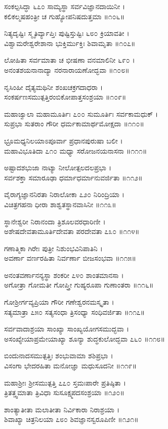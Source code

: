 ಸಂಕಲ್ಪಸಿದ್ಧಾ ೬೭೦ ಸಾಮ್ಯಸ್ಥಾ ಸರ್ವವಿಜ್ಞಾನದಾಯಿನೀ ।\\
ಕಲಿಕಲ್ಮಷಹಂತ್ರೀ ಚ ಗುಹ್ಯೋಪನಿಷದುತ್ತಮಾ ॥೧೦೬॥

ನಿತ್ಯದೃಷ್ಟಿಃ ಸ್ಮೃತಿರ್ವ್ಯಾಪ್ತಿಃ ಪುಷ್ಟಿಸ್ತುಷ್ಟಿಃ ೬೮೦ ಕ್ರಿಯಾವತೀ ।\\
ವಿಶ್ವಾಮರೇಶ್ವರೇಶಾನಾ ಭುಕ್ತಿರ್ಮುಕ್ತಿಃ ಶಿವಾಮೃತಾ ॥೧೦೭॥

ಲೋಹಿತಾ ಸರ್ವಮಾತಾ ಚ ಭೀಷಣಾ ವನಮಾಲಿನೀ ೬೯೦ ।\\
ಅನಂತಶಯನಾನಾದ್ಯಾ ನರನಾರಾಯಣೋದ್ಭವಾ ॥೧೦೮॥

ನೃಸಿಂಹೀ ದೈತ್ಯಮಥಿನೀ ಶಂಖಚಕ್ರಗದಾಧರಾ ।\\
ಸಂಕರ್ಷಣಸಮುತ್ಪತ್ತಿರಂಬಿಕೋಪಾತ್ತಸಂಶ್ರಯಾ ॥೧೦೯॥

ಮಹಾಜ್ವಾಲಾ ಮಹಾಮೂರ್ತಿಃ ೭೦೦ ಸುಮೂರ್ತಿಃ ಸರ್ವಕಾಮಧುಕ್ ।\\
ಸುಪ್ರಭಾ ಸುತರಾಂ ಗೌರೀ ಧರ್ಮಕಾಮಾರ್ಥಮೋಕ್ಷದಾ ॥೧೧೦॥

ಭ್ರೂಮಧ್ಯನಿಲಯಾಽಪೂರ್ವಾ ಪ್ರಧಾನಪುರುಷಾ ಬಲೀ ।\\
ಮಹಾವಿಭೂತಿದಾ ೭೧೦ ಮಧ್ಯಾ ಸರೋಜನಯನಾಸನಾ ॥೧೧೧॥

ಅಷ್ಟಾದಶಭುಜಾ ನಾಟ್ಯಾ ನೀಲೋತ್ಪಲದಲಪ್ರಭಾ ।\\
ಸರ್ವಶಕ್ತಾ ಸಮಾರೂಢಾ ಧರ್ಮಾಧರ್ಮಾನುವರ್ಜಿತಾ ॥೧೧೨॥

ವೈರಾಗ್ಯಜ್ಞಾನನಿರತಾ ನಿರಾಲೋಕಾ ೭೨೦ ನಿರಿಂದ್ರಿಯಾ ।\\
ವಿಚಿತ್ರಗಹನಾ ಧೀರಾ ಶಾಶ್ವತಸ್ಥಾನವಾಸಿನೀ ॥೧೧೩॥

ಸ್ಥಾನೇಶ್ವರೀ ನಿರಾನಂದಾ ತ್ರಿಶೂಲವರಧಾರಿಣೀ ।\\
ಅಶೇಷದೇವತಾಮೂರ್ತಿದೇವತಾ ಪರದೇವತಾ ೭೩೦ ॥೧೧೪॥

ಗಣಾತ್ಮಿಕಾ ಗಿರೇಃ ಪುತ್ರೀ ನಿಶುಂಭವಿನಿಪಾತಿನಿ ।\\
ಅವರ್ಣಾ ವರ್ಣರಹಿತಾ ನಿರ್ವರ್ಣಾ ಬೀಜಸಂಭವಾ ॥೧೧೫॥

ಅನಂತವರ್ಣಾನನ್ಯಸ್ಥಾ ಶಂಕರೀ ೭೪೦ ಶಾಂತಮಾನಸಾ ।\\
ಅಗೋತ್ರಾ ಗೋಮತೀ ಗೋಪ್ತ್ರೀ ಗುಹ್ಯರೂಪಾ ಗುಣಾಂತರಾ ॥೧೧೬॥

ಗೋಶ್ರೀರ್ಗವ್ಯಪ್ರಿಯಾ ಗೌರೀ ಗಣೇಶ್ವರನಮಸ್ಕೃತಾ ।\\
ಸತ್ಯಮಾತ್ರಾ ೭೫೦ ಸತ್ಯಸಂಧಾ ತ್ರಿಸಂಧ್ಯಾ ಸಂಧಿವರ್ಜಿತಾ ॥೧೧೭॥

ಸರ್ವವಾದಾಶ್ರಯಾ ಸಾಂಖ್ಯಾ ಸಾಂಖ್ಯಯೋಗಸಮುದ್ಭವಾ ।\\
ಅಸಂಖ್ಯೇಯಾಪ್ರಮೇಯಾಖ್ಯಾ ಶೂನ್ಯಾ ಶುದ್ಧಕುಲೋದ್ಭವಾ ೭೬೦ ॥೧೧೮॥

ಬಿಂದುನಾದಸಮುತ್ಪತ್ತಿಃ ಶಂಭುವಾಮಾ ಶಶಿಪ್ರಭಾ ।\\
ವಿಸಂಗಾ ಭೇದರಹಿತಾ ಮನೋಜ್ಞಾ ಮಧುಸೂದನೀ ॥೧೧೯॥

ಮಹಾಶ್ರೀಃ ಶ್ರೀಸಮುತ್ಪತ್ತಿ ೭೭೦ ಸ್ತಮಃಪಾರೇ ಪ್ರತಿಷ್ಠಿತಾ ।\\
ತ್ರಿತತ್ತ್ವಮಾತಾ ತ್ರಿವಿಧಾ ಸುಸೂಕ್ಷ್ಮಪದಸಂಶ್ರಯಾ ॥೧೨೦॥

ಶಾಂತ್ಯಾತೀತಾ ಮಲಾತೀತಾ ನಿರ್ವಿಕಾರಾ ನಿರಾಶ್ರಯಾ ।\\
ಶಿವಾಖ್ಯಾ ಚಿತ್ರನಿಲಯಾ ೭೮೦ ಶಿವಜ್ಞಾನಸ್ವರೂಪಿಣೀ ॥೧೨೧॥


